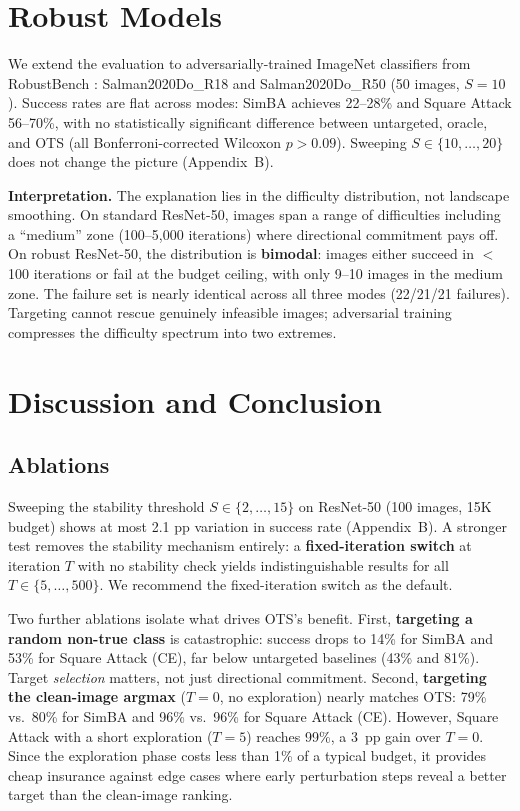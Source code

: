 \documentclass{cap2026}
\begin{document}
\section{Robust Models}\label{sec:robust}

We extend the evaluation to adversarially-trained ImageNet classifiers from RobustBench \citep{salman2020adversarially,croce2021robustbench}: Salman2020Do\_R18 and Salman2020Do\_R50 (50 images, $S=10$). Success rates are flat across modes: SimBA achieves 22--28\% and Square Attack 56--70\%, with no statistically significant difference between untargeted, oracle, and OTS (all Bonferroni-corrected Wilcoxon $p > 0.09$). Sweeping $S \in \{10, \ldots, 20\}$ does not change the picture (Appendix~B).

\textbf{Interpretation.} The explanation lies in the difficulty distribution, not landscape smoothing. On standard ResNet-50, images span a range of difficulties including a ``medium'' zone (100--5,000 iterations) where directional commitment pays off. On robust ResNet-50, the distribution is \textbf{bimodal}: images either succeed in $<$100 iterations or fail at the budget ceiling, with only 9--10 images in the medium zone. The failure set is nearly identical across all three modes (22/21/21 failures). Targeting cannot rescue genuinely infeasible images; adversarial training compresses the difficulty spectrum into two extremes.

\section{Discussion and Conclusion}\label{sec:conclusion}

\subsection{Ablations}\label{sec:ablations}
Sweeping the stability threshold $S \in \{2, \ldots, 15\}$ on ResNet-50 (100 images, 15K budget) shows at most 2.1 pp variation in success rate (Appendix~B). A stronger test removes the stability mechanism entirely: a \textbf{fixed-iteration switch} at iteration $T$ with no stability check yields indistinguishable results for all $T \in \{5, \ldots, 500\}$. We recommend the fixed-iteration switch as the default.

Two further ablations isolate what drives OTS's benefit. First, \textbf{targeting a random non-true class} is catastrophic: success drops to 14\% for SimBA and 53\% for Square Attack (CE), far below untargeted baselines (43\% and 81\%). Target \emph{selection} matters, not just directional commitment. Second, \textbf{targeting the clean-image argmax} ($T = 0$, no exploration) nearly matches OTS: 79\% vs.\ 80\% for SimBA and 96\% vs.\ 96\% for Square Attack (CE). However, Square Attack with a short exploration ($T = 5$) reaches 99\%, a 3~pp gain over $T = 0$. Since the exploration phase costs less than 1\% of a typical budget, it provides cheap insurance against edge cases where early perturbation steps reveal a better target than the clean-image ranking.
\end{document}
